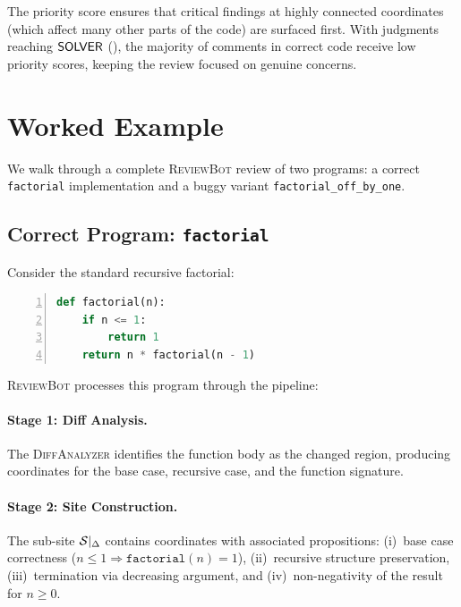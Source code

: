 \documentclass[11pt]{article}
\newcommand{\ReviewBot}{\textsc{ReviewBot}}
\newcommand{\DiffAnalyzer}{\textsc{DiffAnalyzer}}
\begin{document}
The priority score ensures that critical findings at highly connected
coordinates (which affect many other parts of the code) are surfaced first.
With \compTrustSolverdischarged{} judgments reaching $\mathsf{SOLVER}$
(\compTrustSolverdischargedPct{}), the majority of comments in correct
code receive low priority scores, keeping the review focused on genuine
concerns.

\section{Worked Example}\label{sec:worked-example}

We walk through a complete \ReviewBot{} review of two programs: a correct
\texttt{factorial} implementation and a buggy variant
\texttt{factorial\_off\_by\_one}.

\subsection{Correct Program: \texttt{factorial}}

Consider the standard recursive factorial:
\begin{lstlisting}[language=Python,basicstyle=\small\ttfamily,frame=single,
  xleftmargin=1em,numbers=left]
def factorial(n):
    if n <= 1:
        return 1
    return n * factorial(n - 1)
\end{lstlisting}

\ReviewBot{} processes this program through the pipeline:

\paragraph{Stage 1: Diff Analysis.}
The \DiffAnalyzer{} identifies the function body as the changed region,
producing coordinates for the base case, recursive case, and the function
signature.

\paragraph{Stage 2: Site Construction.}
The sub-site $\mathcal{S}|_\Delta$ contains \ppLXVIIrevfactorialProps{}
coordinates with associated propositions: (i)~base case correctness
($n \leq 1 \Rightarrow \texttt{factorial}(n) = 1$), (ii)~recursive
structure preservation, (iii)~termination via decreasing argument, and
(iv)~non-negativity of the result for $n \geq 0$.
\end{document}
